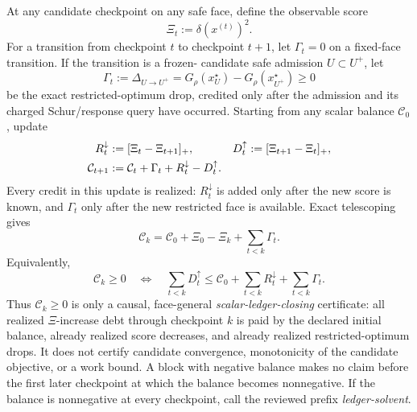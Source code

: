 \begin{proposition}
\label{prop:path-causal-two-admission-recovery}
At any candidate checkpoint on any safe face, define the observable score
\begin{equation}
 \Xi_t:=\delta(x^{(t)})^2.
 \label{eq:causal-face-score}
\end{equation}
For a transition from checkpoint $t$ to checkpoint $t+1$, let
$\Gamma_t=0$ on a fixed-face transition.  If the transition is a frozen-
candidate safe admission $U\subset U^+$, let
\begin{equation*}
 \Gamma_t:=\Delta_{U\to U^+}
 =G_\rho(x_U^\star)-G_\rho(x_{U^+}^\star)\geq0
\end{equation*}
be the exact restricted-optimum drop, credited only after the admission and
its charged Schur/response query have occurred.  Starting from any scalar
balance $\mathcal C_0$, update
\begin{align}
 R_t^\downarrow&:=[\Xi_t-\Xi_{t+1}]_+,
 &D_t^\uparrow&:=[\Xi_{t+1}-\Xi_t]_+,
 \notag\\
 \mathcal C_{t+1}
 &:=\mathcal C_t+\Gamma_t+R_t^\downarrow-D_t^\uparrow.
 \label{eq:causal-recovery-update}
\end{align}
Every credit in this update is realized: $R_t^\downarrow$ is added only after
the new score is known, and $\Gamma_t$ only after the new restricted face is
available.  Exact telescoping gives
\begin{equation}
 \mathcal C_k
 =\mathcal C_0+\Xi_0-\Xi_k+\sum_{t<k}\Gamma_t.
 \label{eq:causal-recovery-invariant}
\end{equation}
Equivalently,
\[
 \mathcal C_k\geq0
 \quad\Longleftrightarrow\quad
 \sum_{t<k}D_t^\uparrow
 \leq
 \mathcal C_0+\sum_{t<k}R_t^\downarrow+\sum_{t<k}\Gamma_t.
\]
Thus $\mathcal C_k\geq0$ is only a causal, face-general
\emph{scalar-ledger-closing} certificate: all realized $\Xi$-increase debt
through checkpoint $k$ is paid by the declared initial balance, already
realized score decreases, and already realized restricted-optimum drops.  It
does not certify candidate convergence, monotonicity of the candidate
objective, or a work bound.  A block with negative balance makes no claim
before the first later checkpoint at which the balance becomes nonnegative.
If the balance is nonnegative at every checkpoint, call the reviewed prefix
\emph{ledger-solvent}.


\end{proposition}
